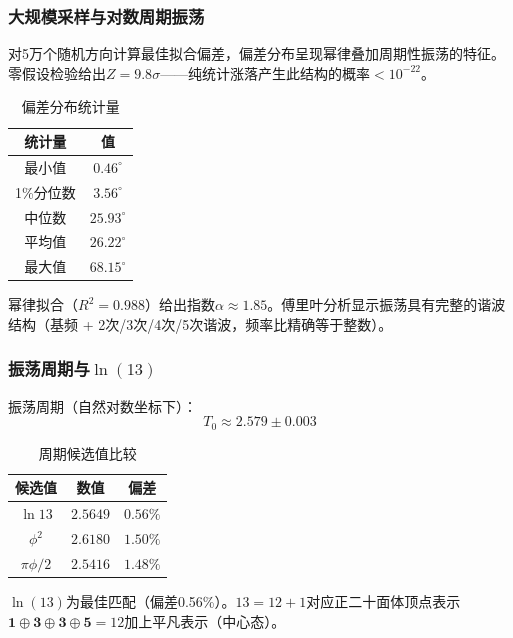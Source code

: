 \subsubsection{大规模采样与对数周期振荡}

对5万个随机方向计算最佳拟合偏差，偏差分布呈现幂律叠加周期性振荡的特征。零假设检验给出$Z = 9.8\sigma$——纯统计涨落产生此结构的概率$< 10^{-22}$。

\begin{table}[htbp]
\centering
\caption{偏差分布统计量}
\label{tab:deviation_stats}
\begin{tabular}{cc}
\hline
统计量 & 值 \\
\hline
最小值 & $0.46^\circ$ \\
1\%分位数 & $3.56^\circ$ \\
中位数 & $25.93^\circ$ \\
平均值 & $26.22^\circ$ \\
最大值 & $68.15^\circ$ \\
\hline
\end{tabular}
\end{table}

幂律拟合（$R^2 = 0.988$）给出指数$\alpha \approx 1.85$。傅里叶分析显示振荡具有完整的谐波结构（基频 + 2次/3次/4次/5次谐波，频率比精确等于整数）。

\subsubsection{振荡周期与$\ln(13)$}

振荡周期（自然对数坐标下）：
\begin{equation}
T_0 \approx 2.579 \pm 0.003
\end{equation}

\begin{table}[htbp]
\centering
\caption{周期候选值比较}
\label{tab:period_candidates}
\begin{tabular}{ccc}
\hline
候选值 & 数值 & 偏差 \\
\hline
$\ln 13$ & $2.5649$ & $0.56\%$ \\
$\phi^2$ & $2.6180$ & $1.50\%$ \\
$\pi\phi/2$ & $2.5416$ & $1.48\%$ \\
\hline
\end{tabular}
\end{table}

$\ln(13)$为最佳匹配（偏差0.56\%）。$13 = 12 + 1$对应正二十面体顶点表示$\mathbf{1}\oplus\mathbf{3}\oplus\mathbf{3}\oplus\mathbf{5} = 12$加上平凡表示（中心态）。

